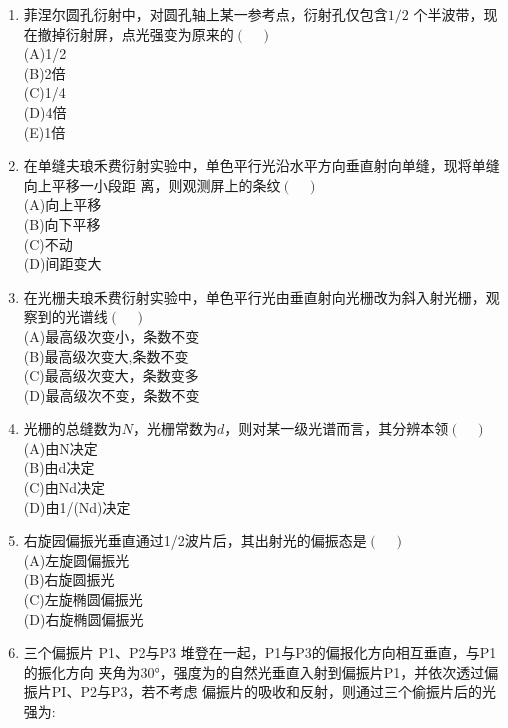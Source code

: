 \begin{enumerate}
\item 菲涅尔圆孔衍射中，对圆孔轴上某一参考点，衍射孔仅包含$ 1/2$ 个半波带，现在撤掉衍射屏，点光强变为原来的$(\quad)$\\
(A)1/2\\
(B)2倍\\
(C)1/4\\
(D)4倍\\
(E)1倍
\item 在单缝夫琅禾费衍射实验中，单色平行光沿水平方向垂直射向单缝，现将单缝向上平移一小段距
离，则观测屏上的条纹$(\quad)$\\
(A)向上平移\\
(B)向下平移\\
(C)不动\\
(D)间距变大
\item 在光栅夫琅禾费衍射实验中，单色平行光由垂直射向光栅改为斜入射光栅，观察到的光谱线$(\quad)$\\
(A)最高级次变小，条数不变\\
(B)最高级次变大,条数不变\\
(C)最高级次变大，条数变多\\
(D)最高级次不变，条数不变
\item 光栅的总缝数为$N$，光栅常数为$d$，则对某一级光谱而言，其分辨本领$(\quad)$\\
(A)由N决定\\
(B)由d决定\\
(C)由Nd决定\\
(D)由1/(Nd)决定
\item 右旋园偏振光垂直通过1/2波片后，其出射光的偏振态是$(\quad)$\\
(A)左旋圆偏振光\\
(B)右旋圆振光\\
(C)左旋椭圆偏振光\\
(D)右旋椭圆偏振光
\item 三个偏振片 P1、P2与P3 堆登在一起，P1与P3的偏报化方向相互垂直，与P1的振化方向
夹角为30°，强度为的自然光垂直入射到偏振片P1，并依次透过偏振片PI、P2与P3，若不考虑
偏振片的吸收和反射，则通过三个偷振片后的光强为:
\end{enumerate}